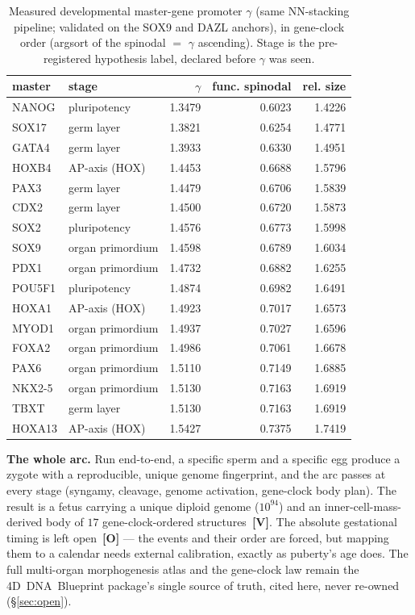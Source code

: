 \documentclass[11pt]{article}
\newcommand{\gradeV}{\textcolor{verified}{\textbf{[V]}}}
\newcommand{\gradeO}{\textcolor{open}{\textbf{[O]}}}
\begin{document}
\begin{table}[H]
\centering
\small
\caption{Measured developmental master-gene promoter $\gamma$ (same NN-stacking pipeline; validated on the SOX9 and DAZL anchors), in gene-clock order (argsort of the spinodal $=$ $\gamma$ ascending). Stage is the pre-registered hypothesis label, declared before $\gamma$ was seen.}
\label{tab:embryo-gamma}
\begin{tabular}{llrrr}
\toprule
master & stage & $\gamma$ & func. spinodal & rel. size \\
\midrule
NANOG & pluripotency & 1.3479 & 0.6023 & 1.4226 \\
SOX17 & germ layer & 1.3821 & 0.6254 & 1.4771 \\
GATA4 & germ layer & 1.3933 & 0.6330 & 1.4951 \\
HOXB4 & AP-axis (HOX) & 1.4453 & 0.6688 & 1.5796 \\
PAX3 & germ layer & 1.4479 & 0.6706 & 1.5839 \\
CDX2 & germ layer & 1.4500 & 0.6720 & 1.5873 \\
SOX2 & pluripotency & 1.4576 & 0.6773 & 1.5998 \\
SOX9 & organ primordium & 1.4598 & 0.6789 & 1.6034 \\
PDX1 & organ primordium & 1.4732 & 0.6882 & 1.6255 \\
POU5F1 & pluripotency & 1.4874 & 0.6982 & 1.6491 \\
HOXA1 & AP-axis (HOX) & 1.4923 & 0.7017 & 1.6573 \\
MYOD1 & organ primordium & 1.4937 & 0.7027 & 1.6596 \\
FOXA2 & organ primordium & 1.4986 & 0.7061 & 1.6678 \\
PAX6 & organ primordium & 1.5110 & 0.7149 & 1.6885 \\
NKX2-5 & organ primordium & 1.5130 & 0.7163 & 1.6919 \\
TBXT & germ layer & 1.5130 & 0.7163 & 1.6919 \\
HOXA13 & AP-axis (HOX) & 1.5427 & 0.7375 & 1.7419 \\
\bottomrule
\end{tabular}
\end{table}

\textbf{The whole arc.} Run end-to-end, a specific sperm and a specific egg produce a zygote with a
reproducible, unique genome fingerprint, and the arc passes at every stage (syngamy, cleavage, genome
activation, gene-clock body plan). The result is a fetus carrying a unique diploid genome
($10^{94}$) and an inner-cell-mass-derived body of
$17$ gene-clock-ordered structures~\gradeV{}. The absolute
gestational timing is left open~\gradeO{} --- the events and their order are forced, but mapping them to a
calendar needs external calibration, exactly as puberty's age does. The full multi-organ morphogenesis atlas
and the gene-clock law remain the 4D~DNA~Blueprint package's single source of truth, cited here, never
re-owned (\S\ref{sec:open}).
\end{document}
